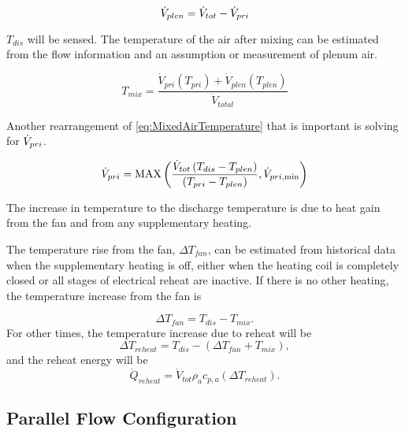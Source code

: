 \begin{equation} \label{eq:TotalFlow}
    \dot{V}_{plen} = \dot{V}_{tot} - \dot{V}_{pri}
\end{equation}

\(T_{dis}\) will be sensed. The temperature of the air after mixing can be estimated from the flow information and an assumption or measurement of plenum air. 


\begin{equation} \label{eq:MixedAirTemperature}
{T_{mix}} = \frac{{{{\dot V}_{pri}}\left( {{T_{pri}}} \right) + \dot V_{plen}\left( {{T_{plen}}} \right)}}{{{{\dot V}_{total}}}}
\end{equation}

Another rearrangement of \ref{eq:MixedAirTemperature} that is important is solving for \(\dot{V}_{pri}\). 

\begin{equation} \label{eq:PrimaryFlowInTerminalUnit}
    \dot{V}_{pri} = \text{MAX}\left(\frac{\dot{V}_{tot} \left(T_{dis} - T_{plen} \right)}{\left(T_{pri} - T_{plen} \right)}, \dot{V}_{pri, \text{min}} \right)
\end{equation}


The increase in temperature to the discharge temperature is due to heat gain from the fan and from any supplementary heating.

The temperature rise from the fan, \(\Delta T_{fan}\), can be estimated from historical data when the supplementary heating is off, either when the heating coil is completely closed or all stages of electrical reheat are inactive. If there is no other heating, the temperature increase from the fan is

\begin{equation}
\Delta {T_{fan}} = {T_{dis}} - {T_{mix}}.
\end{equation}
%
For other times, the temperature increase due to reheat will be
%
\begin{equation}
\Delta {T_{reheat}} = {T_{dis}} - \left( {\Delta {T_{fan}} + {T_{mix}}} \right),
\end{equation}
%
and the reheat energy will be
%
\begin{equation}
{\dot Q_{reheat}} = {\dot V_{tot}}{\rho _a}{c_{p,a}}\left( {\Delta {T_{reheat}}} \right).
\end{equation}

\subsection{Parallel Flow Configuration}

